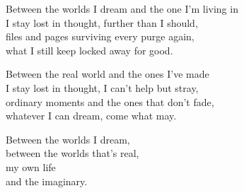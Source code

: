 \begin{lyrics}
Between the worlds I dream and the one I'm living in\\
I stay lost in thought, further than I should,\\
files and pages surviving every purge again,\\
what I still keep locked away for good.

Between the real world and the ones I've made\\
I stay lost in thought, I can't help but stray,\\
ordinary moments and the ones that don't fade,\\
whatever I can dream, come what may.

Between the worlds I dream,\\
between the worlds that's real,\\
my own life\\
and the imaginary.
\end{lyrics}

